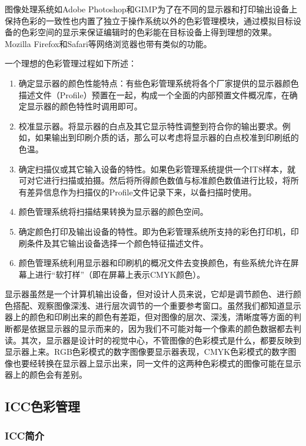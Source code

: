     图像处理系统如Adobe Photoshop和GIMP为了在不同的显示器和打印输出设备上保持色彩的一致性也内置了独立于操作系统以外的色彩管理模块，通过模拟目标设备的色彩空间的显示来保证编辑时的色彩能在目标设备上得到理想的效果。Mozilla Firefox和Safari等网络浏览器也带有类似的功能。


    一个理想的色彩管理过程如下所述：

    \begin{enumerate}
        \item  确定显示器的颜色性能特点：有些色彩管理系统将各个厂家提供的显示器颜色描述文件（Profile）预置在一起，构成一个全面的内部预置文件概况库，在确定显示器的颜色特性时调用即可。
        \item  校准显示器。将显示器的白点及其它显示特性调整到符合你的输出要求。例如，如果输出到印刷介质的话，那么可以考虑将显示器的白点校准到印刷纸的色温。
        \item  确定扫描仪或其它输入设备的特性。如果色彩管理系统提供一个IT8样本，就可对它进行扫描或拍摄。然后将所得颜色数值与标准颜色数值进行比较，将所有差异信息作为扫描仪的Profile文件记录下来，以备扫描时使用。
        \item  颜色管理系统将扫描结果转换为显示器的颜色空间。
        \item  确定颜色打印及输出设备的特性。即为色彩管理系统所支持的彩色打印机，印刷条件及其它输出设备选择一个颜色特征描述文件。
        \item  颜色管理系统利用显示器和印刷机的概况文件去变换颜色，有些系统允许在屏幕上进行“软打样”（即在屏幕上表示CMYK颜色）。
    \end{enumerate}

    显示器虽然是一个计算机输出设备，但对设计人员来说，它却是调节颜色、进行颜色搭配、观察图像深浅、进行层次调节的一个重要参考窗口。虽然我们都知道显示器上的颜色和印刷出来的颜色有差距，但对图像的层次、深浅，清晰度等方面的判断都是依据显示器的显示而来的，因为我们不可能对每一个像素的颜色数据都去判读。其次，显示器是设计时的视觉中心，不管图像的色彩模式是什么，都要反映到显示器上来。RGB色彩模式的数字图像要显示器表现，CMYK色彩模式的数字图像也要经转换在显示器上显示出来，同一文件的这两种色彩模式的图像可能在显示器上的颜色会有差别。

\subsection { ICC色彩管理}

    \subsubsection { ICC简介}

